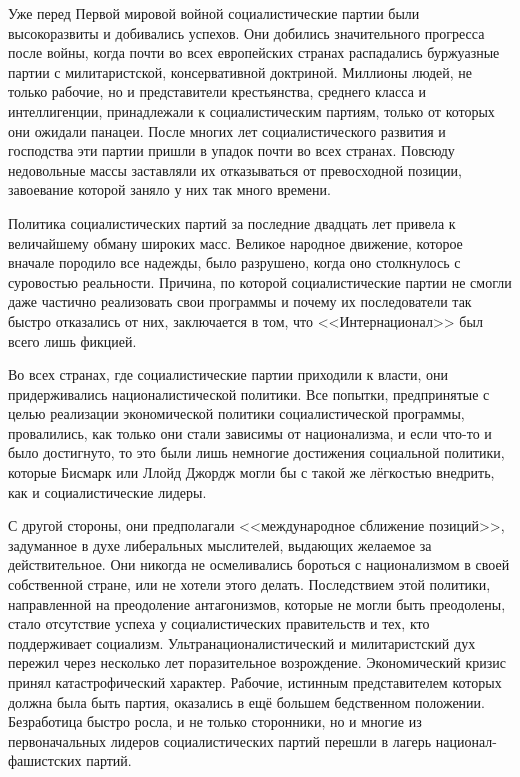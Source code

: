 Уже перед Первой мировой войной социалистические партии были высокоразвиты и добивались успехов. Они добились значительного прогресса после войны, когда почти во всех европейских странах распадались буржуазные партии с милитаристской, консервативной доктриной. Миллионы людей, не только рабочие, но и представители крестьянства, среднего класса и интеллигенции, принадлежали к социалистическим партиям, только от которых они ожидали панацеи. После многих лет социалистического развития и господства эти партии пришли в упадок почти во всех странах. Повсюду недовольные массы заставляли их отказываться от превосходной позиции, завоевание которой заняло у них так много времени.

Политика социалистических партий за последние двадцать лет привела к величайшему обману широких масс. Великое народное движение, которое вначале породило все надежды, было разрушено, когда оно столкнулось с суровостью реальности. Причина, по которой социалистические партии не смогли даже частично реализовать свои программы и почему их последователи так быстро отказались от них, заключается в том, что <<Интернационал>> был всего лишь фикцией.

Во всех странах, где социалистические партии приходили к власти, они придерживались националистической политики. Все попытки, предпринятые с целью реализации экономической политики социалистической программы, провалились, как только они стали зависимы от национализма, и если что-то и было достигнуто, то это были лишь немногие достижения социальной политики, которые Бисмарк или Ллойд Джордж могли бы с такой же лёгкостью внедрить, как и социалистические лидеры.

С другой стороны, они предполагали <<международное сближение позиций>>, задуманное в духе либеральных мыслителей, выдающих желаемое за действительное. Они никогда не осмеливались бороться с национализмом в своей собственной стране, или не хотели этого делать. Последствием этой политики, направленной на преодоление антагонизмов, которые не могли быть преодолены, стало отсутствие успеха у социалистических правительств и тех, кто поддерживает социализм. Ультранационалистический и милитаристский дух пережил через несколько лет поразительное возрождение. Экономический кризис принял катастрофический характер. Рабочие, истинным представителем которых должна была быть партия, оказались в ещё большем бедственном положении. Безработица быстро росла, и не только сторонники, но и многие из первоначальных лидеров социалистических партий перешли в лагерь национал-фашистских партий.

